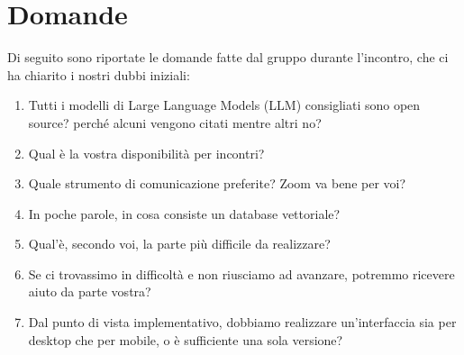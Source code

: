 \documentclass[a4paper, 12pt]{article}
\begin{document}
\section{Domande}
Di seguito sono riportate le domande fatte dal gruppo durante l'incontro, che ci ha chiarito i nostri dubbi iniziali:
\begin{enumerate}
    \item Tutti i modelli di Large Language Models (LLM) consigliati sono open source? perché alcuni vengono citati mentre altri no?
    \item Qual è la vostra disponibilità per incontri?
    \item Quale strumento di comunicazione preferite? Zoom va bene per voi?
    \item In poche parole, in cosa consiste un database vettoriale?
    \item Qual'è, secondo voi, la parte più difficile da realizzare?
    \item Se ci trovassimo in difficoltà e non riusciamo ad avanzare, potremmo ricevere aiuto da parte vostra?
    \item Dal punto di vista implementativo, dobbiamo realizzare un'interfaccia sia per desktop che per mobile, o è sufficiente una sola versione?
\end{enumerate}
\end{document}
